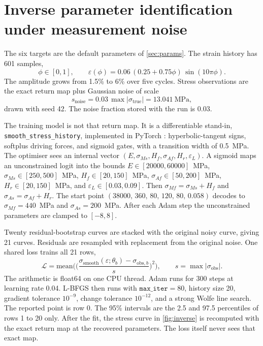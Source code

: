 \documentclass[10pt,a4paper]{article}
\begin{document}
\section{Inverse parameter identification under measurement noise}
\label{sec:inverse}

The six targets are the default parameters of \cref{sec:params}. The strain history has 601 samples,
\begin{equation}
  \phi\in[0,1],
  \qquad
  \varepsilon(\phi)=0.06\,(0.25+0.75\phi)\,\sin(10\pi\phi).
\end{equation}
The amplitude grows from 1.5\% to 6\% over five cycles. Stress observations are the exact return map plus Gaussian noise of scale
\begin{equation}
  s_{\mathrm{noise}}=0.03\,\max|\sigma_{\mathrm{true}}|=13.041~\mathrm{MPa},
\end{equation}
drawn with seed 42. The noise fraction stored with the run is 0.03.

The training model is not that return map. It is a differentiable stand-in, \texttt{smooth\_stress\_history}, implemented in PyTorch \cite{paszke2019}: hyperbolic-tangent signs, softplus driving forces, and sigmoid gates, with a transition width of 0.5~MPa. The optimiser sees an internal vector $(E,\sigma_{Ms},H_f,\sigma_{Af},H_r,\varepsilon_L)$. A sigmoid maps an unconstrained logit into the bounds $E\in[20000,60000]$~MPa, $\sigma_{Ms}\in[250,500]$~MPa, $H_f\in[20,150]$~MPa, $\sigma_{Af}\in[50,200]$~MPa, $H_r\in[20,150]$~MPa, and $\varepsilon_L\in[0.03,0.09]$. Then $\sigma_{Mf}=\sigma_{Ms}+H_f$ and $\sigma_{As}=\sigma_{Af}+H_r$. The start point $(38000,\,360,\,80,\,120,\,80,\,0.058)$ decodes to $\sigma_{Mf}=440$~MPa and $\sigma_{As}=200$~MPa. After each Adam step the unconstrained parameters are clamped to $[-8,8]$.

Twenty residual-bootstrap curves are stacked with the original noisy curve, giving 21 curves. Residuals are resampled with replacement from the original noise. One shared loss trains all 21 rows,
\begin{equation}
  \label{eq:loss}
  \mathcal{L}
  =\mathrm{mean}\Biggl(
    \Biggl(\frac{\sigma_{\mathrm{smooth}}(\varepsilon;\theta_b)-\sigma_{\mathrm{obs},b}}{s}\Biggr)^{\!2}
  \Biggr),
  \qquad
  s=\max|\sigma_{\mathrm{obs}}|.
\end{equation}
The arithmetic is float64 on one CPU thread. Adam runs for 300 steps at learning rate 0.04. L-BFGS then runs with $\texttt{max\_iter}=80$, history size 20, gradient tolerance $10^{-9}$, change tolerance $10^{-12}$, and a strong Wolfe line search. The reported point is row 0. The 95\% intervals are the 2.5 and 97.5 percentiles of rows 1 to 20 only. After the fit, the stress curve in \cref{fig:inverse} is recomputed with the exact return map at the recovered parameters. The loss itself never sees that exact map.
\end{document}

